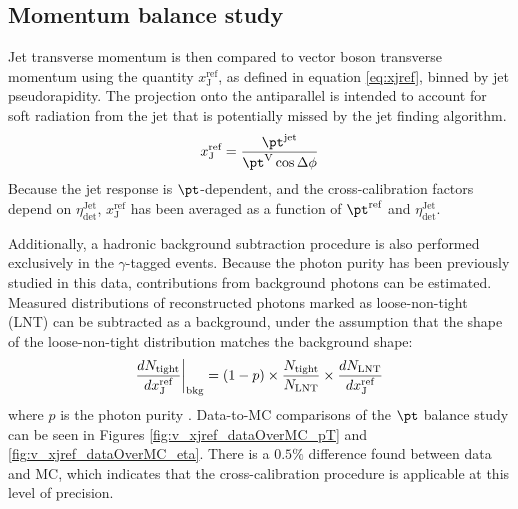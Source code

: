 \documentclass[NOTE, atlasdraft=true, texlive=2016, USenglish]{\ATLASLATEXPATH atlasdoc}
\begin{document}
\subsection{Momentum balance study}
Jet transverse momentum is then compared to vector boson transverse momentum using the quantity $x_{\text{J}}^{\text{ref}}$, as defined in equation \ref{eq:xjref}, binned by jet pseudorapidity. The projection onto the antiparallel is intended to account for soft radiation from the jet that is potentially missed by the jet finding algorithm.
\begin{equation}
	x_{\text{J}}^{\text{ref}} = \frac{\pt^{\text{jet}}}{\pt^{\text{V}} \cos{\Delta\phi}}
	\label{eq:xjref}
\end{equation}
Because the jet response is $\pt$-dependent, and the cross-calibration factors depend on $\eta_{\text{det}}^{\text{Jet}}$, $x_{\text{J}}^{\text{ref}}$ has been averaged as a function of $\pt^{\text{ref}}$ and $\eta_{\text{det}}^{\text{Jet}}$. 

Additionally, a hadronic background subtraction procedure is also performed exclusively in the $\gamma$-tagged events. Because the photon purity has been previously studied in this data, contributions from background photons can be estimated. Measured distributions of reconstructed photons marked as loose-non-tight (LNT) can be subtracted as a background, under the assumption that the shape of the loose-non-tight distribution matches the background shape:
\begin{equation}
	\frac{dN_{\text{tight}}}{dx^{\text{ref}}_{\text{J}}}\bigg{|}_{\text{bkg}} = (1 - p) \times \frac{N_{\text{tight}}}{N_{\text{LNT}}} \times \frac{dN_{\text{LNT}}}{dx^{\text{ref}}_{\text{J}}}
	\label{eq:bkg}
\end{equation}
 where $p$ is the photon purity \cite{ATL-COM-PHYS-2017-999}. Data-to-MC comparisons of the $\pt$ balance study can be seen in Figures \ref{fig:v_xjref_dataOverMC_pT} and \ref{fig:v_xjref_dataOverMC_eta}. There is a $0.5\%$ difference found between data and MC, which indicates that the cross-calibration procedure is applicable at this level of precision.
\end{document}
